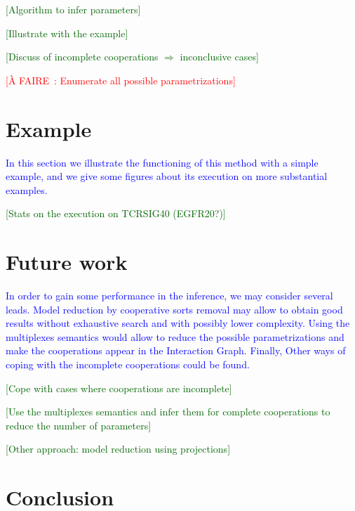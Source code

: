 \documentclass{llncs}
\newcommand{\afaire}[1]{\textcolor{red}{[À FAIRE~: #1]}}
\newcommand{\resume}[1]{\textcolor{blue}{#1}}
\newcommand{\todo}[1]{\textcolor{darkgreen}{[#1]}}
\begin{document}
\todo{Algorithm to infer parameters}

\todo{Illustrate with the example}

\todo{Discuss of incomplete cooperations $\Rightarrow$ inconclusive cases}

\afaire{Enumerate all possible parametrizations}



\section{Example}
\resume{In this section we illustrate the functioning of this method with a simple example, and we give some figures about its execution on more substantial examples.}

\todo{Stats on the execution on TCRSIG40 (EGFR20?)}



\section{Future work}
\resume{In order to gain some performance in the inference, we may consider several leads. Model reduction by cooperative sorts removal may allow to obtain good results without exhaustive search and with possibly lower complexity. Using the multiplexes semantics would allow to reduce the possible parametrizations and make the cooperations appear in the Interaction Graph. Finally, Other ways of coping with the incomplete cooperations could be found.}

\todo{Cope with cases where cooperations are incomplete}

\todo{Use the multiplexes semantics and infer them for complete cooperations to reduce the number of parameters}

\todo{Other approach: model reduction using projections}



\section{Conclusion}
\end{document}
